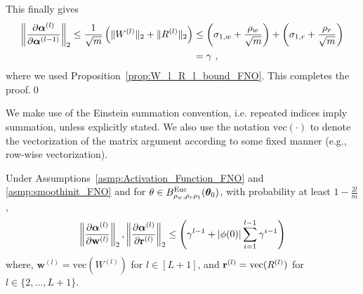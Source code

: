 \begin{lemm}
    This finally gives 
    \begin{align*}
        \left\|\frac{\partial \boldsymbol{\alpha}^{(l)}}{\partial \boldsymbol{\alpha}^{(l-1)}}\right\|_2  
        \leq 
        \frac{1}{\sqrt{m}}\left(\|W^{(l)}\|_2 + \|R^{(l)}\|_2 \right) &\leq
            \left(\sigma_{1,w} + \frac{\rho_w}{\sqrt{m}}\right)
            + \left(\sigma_{1,r} + \frac{\rho_r}{\sqrt{m}}\right) \\
            & = \gamma~,
    \end{align*}
where we used Proposition~\ref{prop:W_l_R_l_bound_FNO}. This completes the proof.\hfill\qed
\end{lemm}

We make use of the Einstein summation convention, i.e. repeated indices imply summation, unless explicitly stated. We also use the notation $\text{vec}(\cdot)$ to denote the vectorization of the matrix argument according to some fixed manner (e.g., row-wise vectorization).

\begin{lemm}
    \label{lemm:gradient_alpha_params}
    Under Assumptions~\ref{asmp:Activation_Function_FNO} and \ref{asmp:smoothinit_FNO} and for $\theta\in B^{\mathrm{Euc}}_{\rho_w,\rho_r\rho_1}({\bm{\theta}}_0)$, with probability at least $ 1 - \frac{2l}{m}$,
    \begin{equation*}
\left\|\dfrac{\partial\boldsymbol{\alpha}^{(l)}}{\partial\mathbf{w}^{(l)}}\right\|_2,\left\|\dfrac{\partial\boldsymbol{\alpha}^{(l)}}{\partial\mathbf{r}^{(l)}}\right\|_2
\leq         
\left(\gamma^{l-1} + |\phi(0)|\sum_{i=1}^{l-1}\gamma^{i-1}\right)
    \end{equation*}
where, $\mathbf{w}^{(l)} = \text{vec}(W^{(l)})$ for $l\in[L+1]$, and $\mathbf{r}^{(l)} = \text{vec}(R^{(l)})$ for $l\in\{2,\dots,L+1\}$. 
\end{lemm} 

